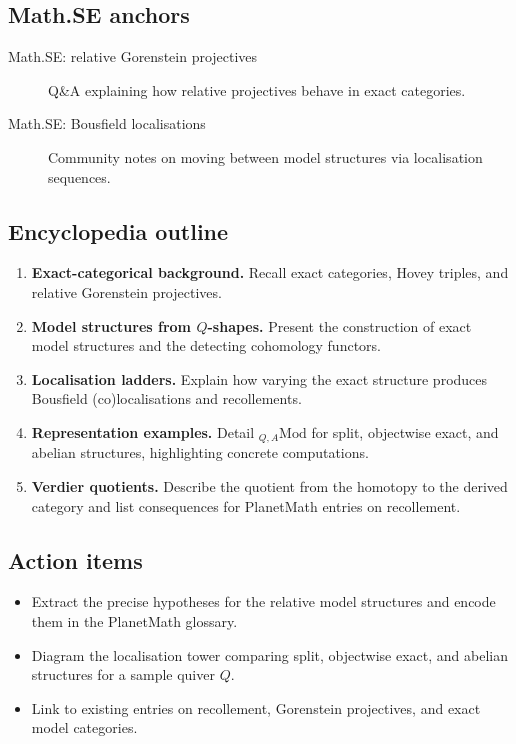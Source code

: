 \subsection*{Math.SE anchors}
\begin{description}
  \item[Math.SE: relative Gorenstein projectives] Q\&A explaining how relative projectives behave in exact categories.
  \item[Math.SE: Bousfield localisations] Community notes on moving between model structures via localisation sequences.
\end{description}
\subsection*{Encyclopedia outline}
\begin{enumerate}
  \item \textbf{Exact-categorical background.} Recall exact categories, Hovey triples, and relative Gorenstein projectives.
  \item \textbf{Model structures from $Q$-shapes.} Present the construction of exact model structures and the detecting cohomology functors.
  \item \textbf{Localisation ladders.} Explain how varying the exact structure produces Bousfield (co)localisations and recollements.
  \item \textbf{Representation examples.} Detail ${}_{Q,A}\mathrm{Mod}$ for split, objectwise exact, and abelian structures, highlighting concrete computations.
  \item \textbf{Verdier quotients.} Describe the quotient from the homotopy to the derived category and list consequences for PlanetMath entries on recollement.
\end{enumerate}
\subsection*{Action items}
\begin{itemize}
  \item Extract the precise hypotheses for the relative model structures and encode them in the PlanetMath glossary.
  \item Diagram the localisation tower comparing split, objectwise exact, and abelian structures for a sample quiver $Q$.
  \item Link to existing entries on recollement, Gorenstein projectives, and exact model categories.
\end{itemize}
